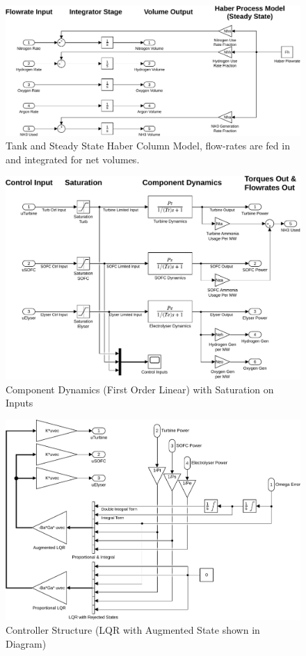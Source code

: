 \begin{figure}[p]
\centering
        \includegraphics[scale=0.65]{images/plant2/tank.pdf}
    \caption{Tank and Steady State Haber Column Model, flow-rates are fed in and integrated for net volumes.}
        \label{fig:tank}
\end{figure}
\begin{figure}[p]
\centering
        \includegraphics[scale=0.7]{images/plant2/comp.pdf}
    \caption{Component Dynamics (First Order Linear) with Saturation on Inputs}
        \label{fig:comp}
\end{figure}
\begin{figure}[p]
\centering
        \includegraphics[scale=0.7]{images/plant2/ctrl.pdf}
    \caption{Controller Structure (LQR with Augmented State shown in Diagram)}
        \label{fig:ctrl}
\end{figure}
